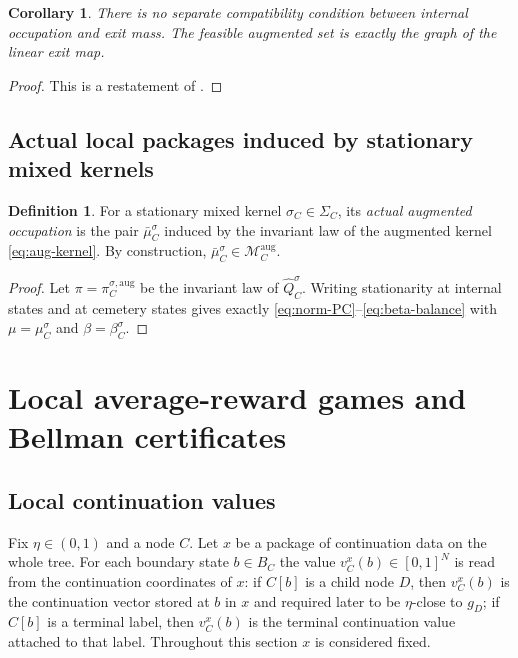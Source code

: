 \documentclass[12pt]{article}
\newtheorem{corollary}[theorem]{Corollary}
\theoremstyle{definition}
\newtheorem{definition}[theorem]{Definition}
\newcommand{\1}{\mathbf{1}}
\newcommand{\cM}{\mathcal{M}}
\begin{document}
\begin{corollary}
\label{cor:no-vp3}
There is no separate compatibility condition between internal occupation and exit
mass.  The feasible augmented set is exactly the graph of the linear exit map.
\end{corollary}

\begin{proof}
This is a restatement of .
\end{proof}

\subsection{Actual local packages induced by stationary mixed kernels}

\begin{definition}
\label{def:actual-local-package}
For a stationary mixed kernel $\sigma_C\in\Sigma_C$, its \emph{actual augmented
occupation} is the pair $\bar\mu_C^{\sigma}$ induced by the invariant law of the
augmented kernel \eqref{eq:aug-kernel}.  By construction,
$\bar\mu_C^{\sigma}\in \cM_C^{\mathrm{aug}}$.
\end{definition}

\begin{proof}
Let $\pi=\pi_C^{\sigma,\mathrm{aug}}$ be the invariant law of
$\widehat Q_C^{\sigma}$.  Writing stationarity at internal states and at cemetery
states gives exactly \eqref{eq:norm-PC}--\eqref{eq:beta-balance} with
$\mu=\mu_C^{\sigma}$ and $\beta=\beta_C^{\sigma}$.
\end{proof}

\section{Local average-reward games and Bellman certificates}
\label{sec:local}

\subsection{Local continuation values}

Fix $\eta\in(0,1)$ and a node $C$.  Let $x$ be a package of continuation data on the
whole tree.  For each boundary state $b\in B_C$ the value $v_C^x(b)\in[0,1]^N$ is
read from the continuation coordinates of $x$: if $C[b]$ is a child node $D$, then
$v_C^x(b)$ is the continuation vector stored at $b$ in $x$ and required later to be
$\eta$-close to $g_D$; if $C[b]$ is a terminal label, then $v_C^x(b)$ is the
terminal continuation value attached to that label.  Throughout this section $x$ is
considered fixed.
\end{document}
